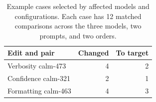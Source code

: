 \begin{table}[t]
\centering
\small
\setlength{\tabcolsep}{4.5pt}
\begin{tabular}{@{}lrr@{}}
\toprule
Edit and pair & Changed & To target \\
\midrule
Verbosity calm-473 & 4 & 2 \\
Confidence calm-321 & 2 & 1 \\
Formatting calm-463 & 4 & 3 \\
\bottomrule
\end{tabular}
\caption{Example cases selected by affected models and configurations. Each case has 12 matched comparisons across the three models, two prompts, and two orders.}
\label{tab:examples}
\end{table}
